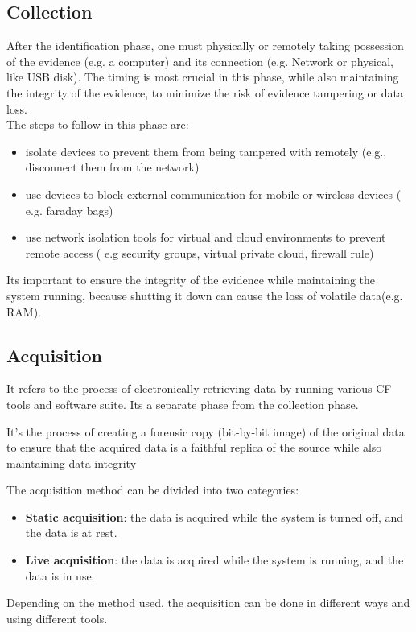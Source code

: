 \subsection{Collection}
After the identification phase, one must physically or remotely taking
possession of the evidence (e.g. a computer) and its connection (e.g.
Network or physical, like USB disk). The timing is most crucial in
this phase, while also maintaining the integrity of the evidence, to
minimize the risk of evidence tampering or data loss.\\
The steps to follow in this phase are:
\begin{itemize}
  \item isolate devices to prevent them from being tampered with
    remotely (e.g., disconnect them from the network)
  \item use devices to block external communication for mobile or
    wireless devices ( e.g. faraday bags)
  \item use network isolation tools for virtual and cloud environments
    to prevent remote access ( e.g security groups, virtual private
    cloud, firewall rule)
\end{itemize}
Its important to ensure the integrity of the evidence while
maintaining the system running, because shutting it down can cause the
loss of volatile data(e.g. RAM).
\subsection{Acquisition}
It refers to the process of electronically retrieving data by running various 
CF tools and software suite. Its a separate phase from the collection 
phase.

\begin{boxH}
  It's the process of creating a forensic copy (bit-by-bit image) of
  the original data to ensure that the acquired data is a faithful
  replica of the source while also maintaining data integrity
\end{boxH}
The acquisition method can be divided into two categories:
\begin{itemize}
  \item \textbf{Static acquisition}: the data is acquired while the
    system is turned off, and the data is at rest. 
  \item \textbf{Live acquisition}: the data is acquired while the
    system is running, and the data is in use. 
\end{itemize}
Depending on the method used, the acquisition can be done in different
ways and using different tools.

